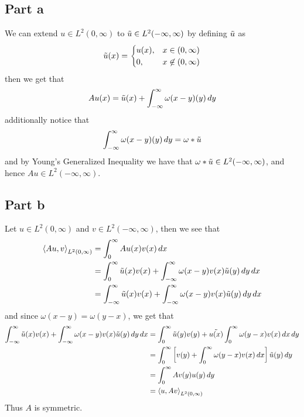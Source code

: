 \documentclass[12pt]{report}
\newcommand{\inner}[2]{\left\langle#1,#2\right\rangle}
\begin{document}
\subsection*{Part a}
We can extend $u \in L^2(0,\infty)$ to $\Tilde{u} \in L^2(-\infty,\infty)$ by defining $\Tilde{u}$ as
\begin{equation*}
    \Tilde{u}(x) = \begin{cases}
        u(x), & x \in (0,\infty) \\
        0, & x \not\in (0,\infty)
    \end{cases}
\end{equation*}
then we get that
\begin{equation*}
    Au(x) = \Tilde{u}(x) + \int_{-\infty}^\infty \omega(x-y) \title{u}(y) \, dy
\end{equation*}
additionally notice that
\begin{equation*}
    \int_{-\infty}^\infty \omega(x-y) \title{u}(y) \, dy = \omega * \Tilde{u}
\end{equation*}
and by Young's Generalized Inequality we have that $\omega * \Tilde{u} \in L^2(-\infty, \infty)$, and hence $Au \in L^2(-\infty,\infty)$.

\subsection*{Part b}
Let $u \in L^2(0,\infty)$ and $v \in L^2(-\infty,\infty)$, then we see that
\begin{align*} 
    \inner{Au}{v}_{L^2(0,\infty)} &= \int_{0}^\infty Au(x) v(x) \, dx \\
    &=\int_0^\infty \Tilde{u}(x)v(x) + \int_{-\infty}^\infty \omega(x-y)v(x) \Tilde{u}(y) \, dy \, dx \\
    &= \int_{-\infty}^\infty \Tilde{u}(x)v(x) + \int_{-\infty}^\infty \omega(x-y)v(x) \Tilde{u}(y) \, dy \, dx 
\end{align*}
and since $\omega(x-y) = \omega(y-x)$, we get that
\begin{align*}
\int_{-\infty}^\infty \Tilde{u}(x)v(x) + \int_{-\infty}^\infty \omega(x-y)v(x) \Tilde{u}(y) \, dy \, dx &= \int_{0}^\infty \Tilde{u}(y)v(y) + \Tilde{u(x)} \int_{0}^\infty \omega(y-x) v(x) \, dx \,dy \\
&= \int_{0}^\infty \left[v(y) + \int_{0}^\infty \omega(y-x) v(x) \, dx\right] \Tilde{u}(y) \, dy \\
&= \int_{0}^\infty Av(y) u(y) \, dy \\
&= \inner{u}{Av}_{L^2(0,\infty)}
\end{align*}
Thus $A$ is symmetric.
\end{document}
